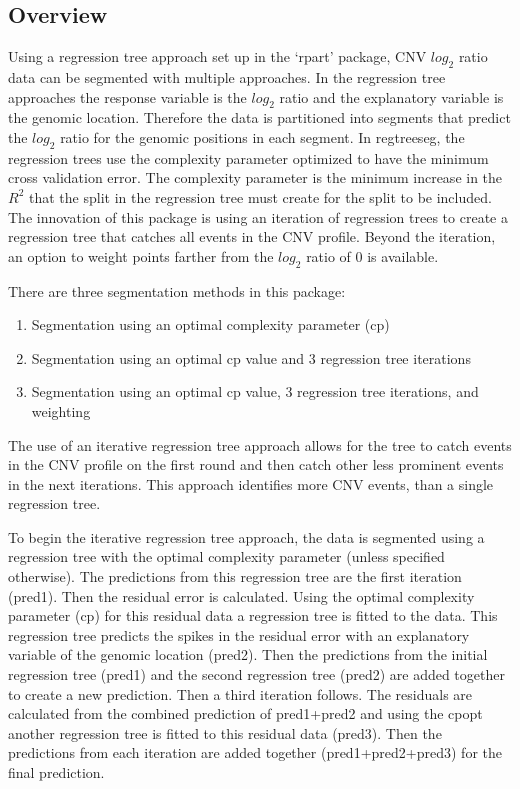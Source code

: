 \documentclass[
]{article}
\begin{document}
\hypertarget{overview}{%
\subsection{Overview}\label{overview}}

Using a regression tree approach set up in the `rpart' package, CNV
\(log_2\) ratio data can be segmented with multiple approaches. In the
regression tree approaches the response variable is the \(log_2\) ratio
and the explanatory variable is the genomic location. Therefore the data
is partitioned into segments that predict the \(log_2\) ratio for the
genomic positions in each segment. In regtreeseg, the regression trees
use the complexity parameter optimized to have the minimum cross
validation error. The complexity parameter is the minimum increase in
the \(R^2\) that the split in the regression tree must create for the
split to be included. The innovation of this package is using an
iteration of regression trees to create a regression tree that catches
all events in the CNV profile. Beyond the iteration, an option to weight
points farther from the \(log_2\) ratio of 0 is available.

There are three segmentation methods in this package:

\begin{enumerate}
\def\labelenumi{\arabic{enumi}.}
\item
  Segmentation using an optimal complexity parameter (cp)
\item
  Segmentation using an optimal cp value and 3 regression tree
  iterations
\item
  Segmentation using an optimal cp value, 3 regression tree iterations,
  and weighting
\end{enumerate}

The use of an iterative regression tree approach allows for the tree to
catch events in the CNV profile on the first round and then catch other
less prominent events in the next iterations. This approach identifies
more CNV events, than a single regression tree.

To begin the iterative regression tree approach, the data is segmented
using a regression tree with the optimal complexity parameter (unless
specified otherwise). The predictions from this regression tree are the
first iteration (pred1). Then the residual error is calculated. Using
the optimal complexity parameter (cp) for this residual data a
regression tree is fitted to the data. This regression tree predicts the
spikes in the residual error with an explanatory variable of the genomic
location (pred2). Then the predictions from the initial regression tree
(pred1) and the second regression tree (pred2) are added together to
create a new prediction. Then a third iteration follows. The residuals
are calculated from the combined prediction of pred1+pred2 and using the
cpopt another regression tree is fitted to this residual data (pred3).
Then the predictions from each iteration are added together
(pred1+pred2+pred3) for the final prediction.
\end{document}
